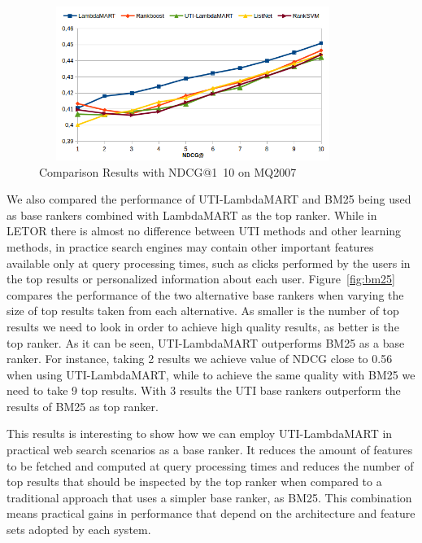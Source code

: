 \documentclass[preprint,review,10pt,3p]{elsarticle}
\begin{document}
\begin{figure}[h!]

\begin{center}

\includegraphics[width=10cm, height=5cm]{im_ndcg_baseline.png}

\caption{Comparison Results with NDCG@1~10 on MQ2007}

\label{fig:ncdg10}

\end{center}

\end{figure}

We also compared the performance of UTI-LambdaMART and BM25 being used
as base rankers combined with LambdaMART as the top ranker. While in
LETOR there is almost no difference between UTI methods and other
learning methods, in practice search engines may contain other
important features available only at query processing times, such as
clicks performed by the users in the top results or personalized
information about each user. Figure~\ref{fig:bm25} compares the
performance of the two alternative base rankers when varying the size
of top results taken from each alternative. As smaller is the number
of top results we need to look in order to achieve high quality
results, as better is the top ranker. As it can be seen,
UTI-LambdaMART outperforms BM25 as a base ranker. For instance, taking
2 results we achieve value of NDCG close to 0.56 when using
UTI-LambdaMART, while to achieve the same quality with BM25 we need to
take 9 top results. With 3 results the UTI base rankers outperform the
results of BM25 as top ranker.

This results is interesting to show how we can employ UTI-LambdaMART
in practical web search scenarios as a base ranker. It reduces the
amount of features to be fetched and computed at query processing
times and reduces the number of top results that should be inspected
by the top ranker when compared to a traditional approach that uses a
simpler base ranker, as BM25. This combination means practical gains
in performance that depend on the architecture and feature sets
adopted by each system.
\end{document}
